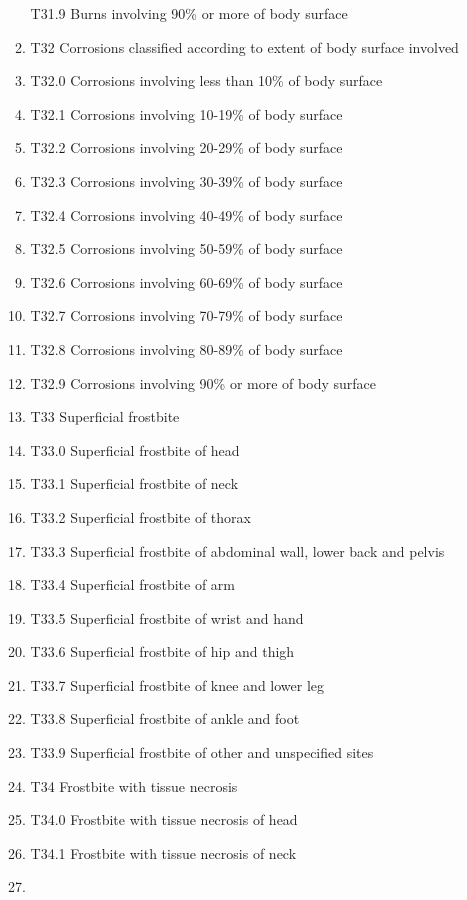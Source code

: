 \documentclass[
]{scrartcl}
\begin{document}
\begin{itemize}
\begin{enumerate}
    T31.9 Burns involving 90\% or more of body surface
  \item
    T32 Corrosions classified according to extent of body surface
    involved
  \item
    T32.0 Corrosions involving less than 10\% of body surface
  \item
    T32.1 Corrosions involving 10-19\% of body surface
  \item
    T32.2 Corrosions involving 20-29\% of body surface
  \item
    T32.3 Corrosions involving 30-39\% of body surface
  \item
    T32.4 Corrosions involving 40-49\% of body surface
  \item
    T32.5 Corrosions involving 50-59\% of body surface
  \item
    T32.6 Corrosions involving 60-69\% of body surface
  \item
    T32.7 Corrosions involving 70-79\% of body surface
  \item
    T32.8 Corrosions involving 80-89\% of body surface
  \item
    T32.9 Corrosions involving 90\% or more of body surface
  \item
    T33 Superficial frostbite
  \item
    T33.0 Superficial frostbite of head
  \item
    T33.1 Superficial frostbite of neck
  \item
    T33.2 Superficial frostbite of thorax
  \item
    T33.3 Superficial frostbite of abdominal wall, lower back and pelvis
  \item
    T33.4 Superficial frostbite of arm
  \item
    T33.5 Superficial frostbite of wrist and hand
  \item
    T33.6 Superficial frostbite of hip and thigh
  \item
    T33.7 Superficial frostbite of knee and lower leg
  \item
    T33.8 Superficial frostbite of ankle and foot
  \item
    T33.9 Superficial frostbite of other and unspecified sites
  \item
    T34 Frostbite with tissue necrosis
  \item
    T34.0 Frostbite with tissue necrosis of head
  \item
    T34.1 Frostbite with tissue necrosis of neck
  \item

\end{enumerate}
\end{itemize}
\end{document}
